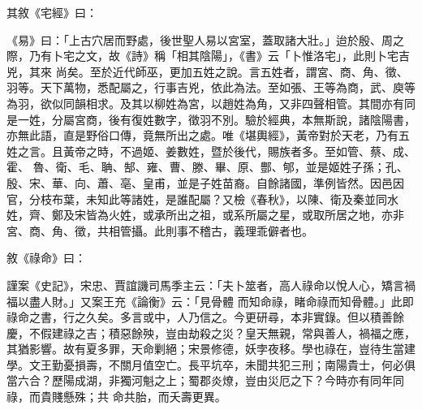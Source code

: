 \begin{pinyinscope}
 其敘《宅經》曰：



 《易》曰：「上古穴居而野處，後世聖人易以宮室，蓋取諸大壯。」迨於殷、周之際，乃有卜宅之文，故《詩》稱「相其陰陽」，《書》云「卜惟洛宅」，此則卜宅吉兇，其來
 尚矣。至於近代師巫，更加五姓之說。言五姓者，謂宮、商、角、徵、羽等。天下萬物，悉配屬之，行事吉兇，依此為法。至如張、王等為商，武、庾等為羽，欲似同韻相求。及其以柳姓為宮，以趙姓為角，又非四聲相管。其間亦有同是一姓，分屬宮商，後有復姓數字，徵羽不別。驗於經典，本無斯說，諸陰陽書，亦無此語，直是野俗口傳，竟無所出之處。唯《堪輿經》，黃帝對於天老，乃有五姓之言。且黃帝之時，不過姬、姜數姓，暨於後代，賜族者多。至如管、蔡、成、霍、
 魯、衛、毛、聃、郜、雍、曹、滕、畢、原、酆、郇，並是姬姓子孫；孔、殷、宋、華、向、蕭、亳、皇甫，並是子姓苗裔。自餘諸國，準例皆然。因邑因官，分枝布葉，未知此等諸姓，是誰配屬？又檢《春秋》，以陳、衛及秦並同水姓，齊、鄭及宋皆為火姓，或承所出之祖，或系所屬之星，或取所居之地，亦非宮、商、角、徵，共相管攝。此則事不稽古，義理乖僻者也。



 敘《祿命》曰：



 謹案《史記》，宋忠、賈誼譏司馬季主云：「夫卜筮者，高人祿命以悅人心，矯言禍福以盡人財。」又案王充《論衡》云：「見骨體
 而知命祿，睹命祿而知骨體。」此即祿命之書，行之久矣。多言或中，人乃信之。今更研尋，本非實錄。但以積善餘慶，不假建祿之吉；積惡餘殃，豈由劫殺之災？皇天無親，常與善人，禍福之應，其猶影響。故有夏多罪，天命剿絕；宋景修德，妖孛夜移。學也祿在，豈待生當建學。文王勤憂損壽，不關月值空亡。長平坑卒，未聞共犯三刑；南陽貴士，何必俱當六合？歷陽成湖，非獨河魁之上；蜀郡炎燎，豈由災厄之下？今時亦有同年同祿，而貴賤懸殊；共
 命共胎，而夭壽更異。




\end{pinyinscope}
